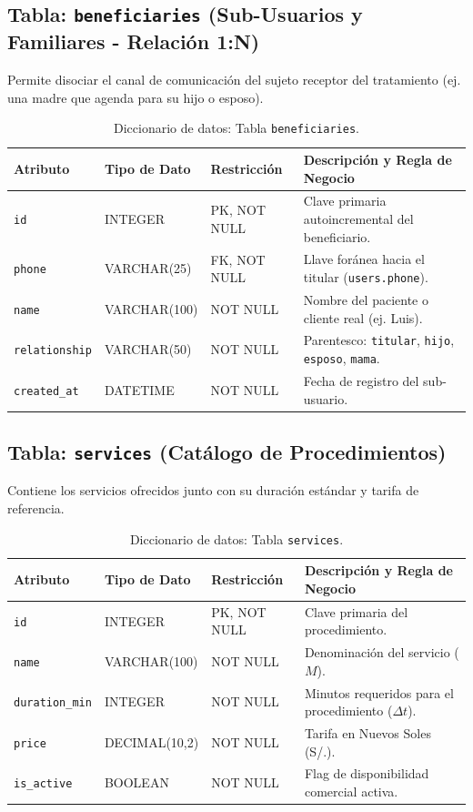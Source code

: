 \documentclass[12pt,a4paper]{report}
\begin{document}
\subsection{Tabla: \texttt{beneficiaries} (Sub-Usuarios y Familiares - Relación 1:N)}
Permite disociar el canal de comunicación del sujeto receptor del tratamiento (ej. una madre que agenda para su hijo o esposo).
\begin{table}[h!]
\centering
\small
\begin{tabularx}{\textwidth}{|p{2.6cm}|p{2.9cm}|p{2.4cm}|X|}
\hline
\rowcolor{BrandPrimary!20}
\textbf{Atributo} & \textbf{Tipo de Dato} & \textbf{Restricción} & \textbf{Descripción y Regla de Negocio} \\
\hline
\texttt{id} & INTEGER & PK, NOT NULL & Clave primaria autoincremental del beneficiario. \\
\hline
\texttt{phone} & VARCHAR(25) & FK, NOT NULL & Llave foránea hacia el titular (\texttt{users.phone}). \\
\hline
\texttt{name} & VARCHAR(100) & NOT NULL & Nombre del paciente o cliente real (ej. Luis). \\
\hline
\texttt{relationship}& VARCHAR(50) & NOT NULL & Parentesco: \texttt{titular}, \texttt{hijo}, \texttt{esposo}, \texttt{mama}. \\
\hline
\texttt{created\_at} & DATETIME & NOT NULL & Fecha de registro del sub-usuario. \\
\hline
\end{tabularx}
\caption{Diccionario de datos: Tabla \texttt{beneficiaries}.}
\label{tab:dic_beneficiaries}
\end{table}

\subsection{Tabla: \texttt{services} (Catálogo de Procedimientos)}
Contiene los servicios ofrecidos junto con su duración estándar y tarifa de referencia.
\begin{table}[h!]
\centering
\small
\begin{tabularx}{\textwidth}{|p{2.8cm}|p{2.9cm}|p{2.4cm}|X|}
\hline
\rowcolor{BrandPrimary!20}
\textbf{Atributo} & \textbf{Tipo de Dato} & \textbf{Restricción} & \textbf{Descripción y Regla de Negocio} \\
\hline
\texttt{id} & INTEGER & PK, NOT NULL & Clave primaria del procedimiento. \\
\hline
\texttt{name} & VARCHAR(100) & NOT NULL & Denominación del servicio ($M$). \\
\hline
\texttt{duration\_min} & INTEGER & NOT NULL & Minutos requeridos para el procedimiento ($\Delta t$). \\
\hline
\texttt{price} & DECIMAL(10,2)& NOT NULL & Tarifa en Nuevos Soles (S/.). \\
\hline
\texttt{is\_active} & BOOLEAN & NOT NULL & Flag de disponibilidad comercial activa. \\
\hline
\end{tabularx}
\caption{Diccionario de datos: Tabla \texttt{services}.}
\label{tab:dic_services}
\end{table}
\end{document}
